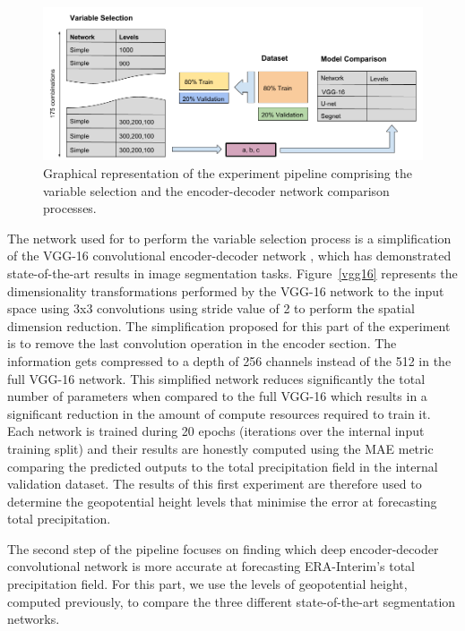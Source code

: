\documentclass[twocol]{ametsoc}
\begin{document}
\begin{figure}[h]
 \centerline{\includegraphics[width=13cm]{experiment.png}}
  \caption{Graphical representation of the experiment pipeline comprising the variable selection and the encoder-decoder network comparison processes.}\label{exp}
\end{figure}

The network used for to perform the variable selection process is a simplification of the VGG-16 convolutional encoder-decoder network \citep{long2015fully}, which has demonstrated state-of-the-art results in image segmentation tasks. Figure~\ref{vgg16} represents the dimensionality transformations performed by the VGG-16 network to the input space using 3x3 convolutions using stride value of 2 to perform the spatial dimension reduction. The simplification proposed for this part of the experiment is to remove the last convolution operation in the encoder section. The information gets compressed to a depth of 256 channels instead of the 512 in the full VGG-16 network. This simplified network reduces significantly the total number of parameters when compared to the full VGG-16 which results in a significant reduction in the amount of compute resources required to train it. Each network is trained during 20 epochs (iterations over the internal input training split) and their results are honestly computed using the MAE metric comparing the predicted outputs to the total precipitation field in the internal validation dataset. The results of this first experiment are therefore used to determine the geopotential height levels that minimise the error at forecasting total precipitation. 

The second step of the pipeline focuses on finding which deep encoder-decoder convolutional network is more accurate at forecasting ERA-Interim's total precipitation field. For this part, we use the levels of geopotential height, computed previously, to compare the three different state-of-the-art segmentation networks.
\end{document}
